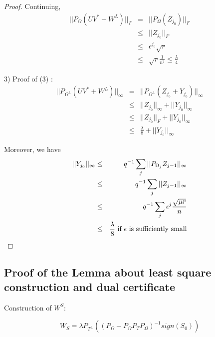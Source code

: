\begin{proof}
Continuing, 
\begin{eqnarray*}
||P_{\Omega}(UV^{*}+W^{L})||_{F} & = & ||P_{\Omega}(Z_{j_{0}})||_{F}\\
 & \le & ||Z_{j_{0}}||_{F}\\
 & \le & \epsilon^{j_{0}}\sqrt{r}\\
 & \le & \sqrt{r}\frac{1}{n^{2}}\le\frac{\lambda}{4}
\end{eqnarray*}


3) Proof of (3) : 
\begin{eqnarray*}
||P_{\Omega^{\bot}}(UV^{*}+W^{L})||_{\infty} & = & ||P_{\Omega^{\bot}}(Z_{j_{0}}+Y_{j_{0}})||_{\infty}\\
 & \le & ||Z_{j_{0}}||_{\infty}+||Y_{j_{0}}||_{\infty}\\
 & \le & ||Z_{j_{0}}||_{F}+||Y_{j_{0}}||_{\infty}\\
 & \le & \frac{\lambda}{8}+||Y_{j_{0}}||_{\infty}
\end{eqnarray*}


Moreover, we have 
\begin{eqnarray*}
||Y_{j_{0}}||_{\infty} & \le & q^{-1}\sum_{j}||P_{\Omega_{j}}Z_{j-1}||_{\infty}\\
 & \le & q^{-1}\sum_{j}||Z_{j-1}||_{\infty}\\
 & \le & q^{-1}\sum_{j}\epsilon^{j}\frac{\sqrt{\mu r}}{n}\\
 & \le & \frac{\lambda}{8}\text{ if \ensuremath{\epsilon}\ \text{is sufficiently small}}
\end{eqnarray*}

\end{proof}


\subsection{Proof of the Lemma about least square construction and dual certificate }

Construction of $W^{S}$:

\[
W_{S}=\lambda P_{T^{\bot}}((P_{\Omega}-P_{\Omega}P_{T}P_{\Omega})^{-1}sign(S_{0}))
\]

